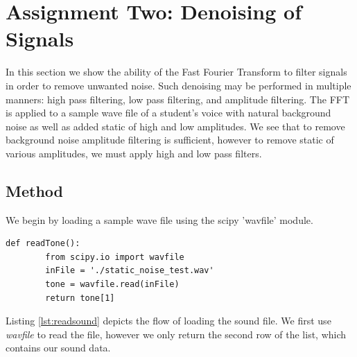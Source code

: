 
\section{Assignment Two: Denoising of Signals} %
\label{sec:assignment_two_denoising_of_signals}

In this section we show the ability of the Fast Fourier Transform to filter signals in order to remove unwanted noise. Such denoising may be performed in multiple manners: high pass filtering, low pass filtering, and amplitude filtering. The FFT is applied to a sample wave file of a student's voice with natural background noise as well as added static of high and low amplitudes. We see that to remove background noise amplitude filtering is sufficient, however to remove static of various amplitudes, we must apply high and low pass filters.

\subsection{Method} %
\label{sub:method}
We begin by loading a sample wave file using the scipy 'wavfile' module.

\begin{lstlisting}[caption={Sound File Reading},label=lst:readsound,firstnumber=6]
    def readTone():
        from scipy.io import wavfile
        inFile = './static_noise_test.wav'
        tone = wavfile.read(inFile)
        return tone[1]
\end{lstlisting}
Listing \ref{lst:readsound} depicts the flow of loading the sound file. We first use \emph{wavfile} to read the file, however we only return the second row of the list, which contains our sound data.

